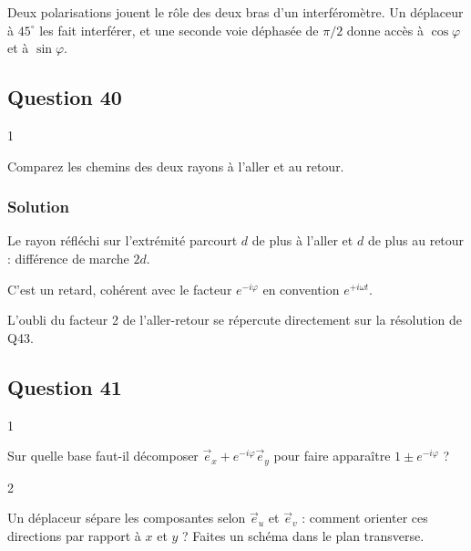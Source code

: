 \documentclass[11pt,a4paper]{article}
\newcommand{\equationajustee}[1]{%
  \sbox{\boiteequation}{$\displaystyle #1$}%
  \ifdim\wd\boiteequation>\linewidth
    \[\resizebox{\linewidth}{!}{\usebox{\boiteequation}}\]%
  \else
    \[#1\]%
  \fi}
\begin{document}
Deux polarisations jouent le rôle des deux bras d'un interféromètre. Un déplaceur à \(45^\circ\) les fait interférer, et une seconde voie déphasée de \(\pi/2\) donne accès à \(\cos\varphi\) et à \(\sin\varphi\).

\hypertarget{question-40}{%
\subsection{Question 40}\label{question-40}}

\begin{indication}{1}

Comparez les chemins des deux rayons à l'aller et au retour.

\end{indication}

\hypertarget{solution-39}{%
\subsubsection{Solution}\label{solution-39}}

Le rayon réfléchi sur l'extrémité parcourt \(d\) de plus à l'aller et \(d\) de plus au retour : différence de marche \(2d\).

\equationajustee{\boxed{\varphi=\frac{2\pi}{\lambda_0}\,2d=\frac{4\pi d}{\lambda_0}}}

C'est un retard, cohérent avec le facteur \(e^{-i\varphi}\) en convention \(e^{+i\omega t}\).

\begin{piege}

L'oubli du facteur 2 de l'aller-retour se répercute directement sur la résolution de Q43.

\end{piege}

\hypertarget{question-41}{%
\subsection{Question 41}\label{question-41}}

\begin{indication}{1}

Sur quelle base faut-il décomposer \(\vec e_x+e^{-i\varphi}\vec e_y\) pour faire apparaître \(1\pm e^{-i\varphi}\) ?

\end{indication}

\begin{indication}{2}

Un déplaceur sépare les composantes selon \(\vec e_u\) et \(\vec e_v\) : comment orienter ces directions par rapport à \(x\) et \(y\) ? Faites un schéma dans le plan transverse.

\end{indication}
\end{document}
